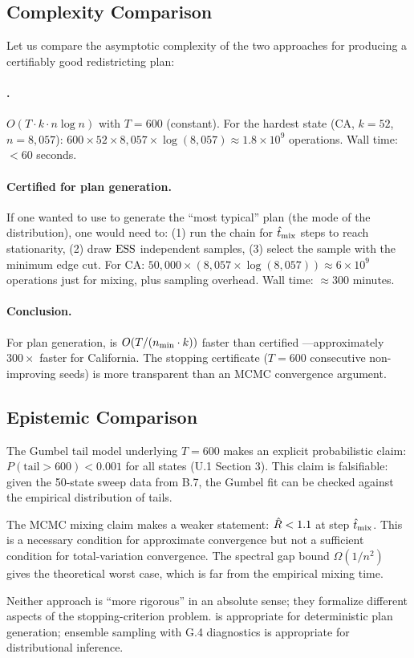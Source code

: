 \subsection{Complexity Comparison}

Let us compare the asymptotic complexity of the two approaches for
producing a certifiably good redistricting plan:

\paragraph{\cs{}.}
$O(T \cdot k \cdot n \log n)$ with $T = 600$ (constant).
For the hardest state (CA, $k = 52$, $n = 8{,}057$):
$600 \times 52 \times 8{,}057 \times \log(8{,}057) \approx 1.8 \times 10^9$ operations.
Wall time: $<$60 seconds.

\paragraph{Certified \recom{} for plan generation.}
If one wanted to use \recom{} to generate the ``most typical'' plan
(the mode of the distribution), one would need to:
(1) run the chain for $\hat{t}_{\rm mix}$ steps to reach stationarity,
(2) draw $\mathrm{ESS}$ independent samples,
(3) select the sample with the minimum edge cut.
For CA: $50{,}000 \times (8{,}057 \times \log(8{,}057)) \approx 6 \times 10^9$ operations
just for mixing, plus sampling overhead.
Wall time: $\approx$300 minutes.

\paragraph{Conclusion.}
For plan generation, \cs{} is $O(T/(n_{\rm min} \cdot k))$ faster than
certified \recom{}---approximately $300\times$ faster for California.
The stopping certificate ($T = 600$ consecutive non-improving seeds) is
more transparent than an MCMC convergence argument.

\subsection{Epistemic Comparison}

The Gumbel tail model underlying $T = 600$ makes an explicit probabilistic
claim: $P(\text{tail} > 600) < 0.001$ for all states (U.1 Section 3).
This claim is falsifiable: given the 50-state sweep data from B.7, the
Gumbel fit can be checked against the empirical distribution of tails.

The MCMC mixing claim makes a weaker statement: $\hat{R} < 1.1$ at step
$\hat{t}_{\rm mix}$.
This is a necessary condition for approximate convergence but not a
sufficient condition for total-variation convergence.
The spectral gap bound $\Omega(1/n^2)$ gives the theoretical worst case,
which is far from the empirical mixing time.

Neither approach is ``more rigorous'' in an absolute sense; they formalize
different aspects of the stopping-criterion problem.
\cs{} is appropriate for deterministic plan generation; ensemble sampling
with G.4 diagnostics is appropriate for distributional inference.
